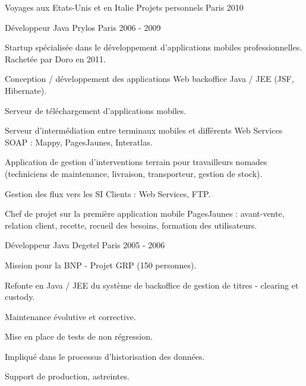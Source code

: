 \begin{cventries}
  \cventry
    {Voyages aux Etats-Unis et en Italie} %
    {Projets personnels} %
    {Paris} %
    {2010} %
        {
      \begin{cvitems} %
      \end{cvitems}
    }

  \cventry
    {Développeur Java} %
    {Prylos} %
    {Paris} %
    {2006 - 2009} %
    {
      \begin{cvitems} %
        \item {Startup spécialisée dans le développement d'applications mobiles professionnelles. Rachetée par Doro en 2011.}
        \item {Conception / développement des applications Web backoffice Java / JEE (JSF, Hibernate).}
        \item {Serveur de téléchargement d’applications mobiles.}
        \item {Serveur d’intermédiation entre terminaux mobiles et différents Web Services SOAP : Mappy, PagesJaunes, Interatlas.}
        \item {Application de gestion d’interventions terrain pour travailleurs nomades (techniciens de maintenance, livraison, transporteur, gestion de stock).}
        \item {Gestion des flux vers les SI Clients : Web Services, FTP.}
        \item {Chef de projet sur la première application mobile PagesJaunes : avant-vente, relation client, recette, recueil des besoins, formation des utilisateurs.}
      \end{cvitems}
    }

  \cventry
    {Développeur Java} %
    {Degetel} %
    {Paris} %
    {2005 - 2006} %
    {
      \begin{cvitems} %
        \item {Mission pour la BNP - Projet GRP (150 personnes).}
        \item {Refonte en Java / JEE du système de backoffice de gestion de titres - clearing et custody.}
        \item {Maintenance évolutive et corrective.}
        \item {Mise en place de tests de non régression.}
        \item {Impliqué dans le processus d'historisation des données.}
        \item {Support de production, astreintes.}
      \end{cvitems}
    }


\end{cventries}

